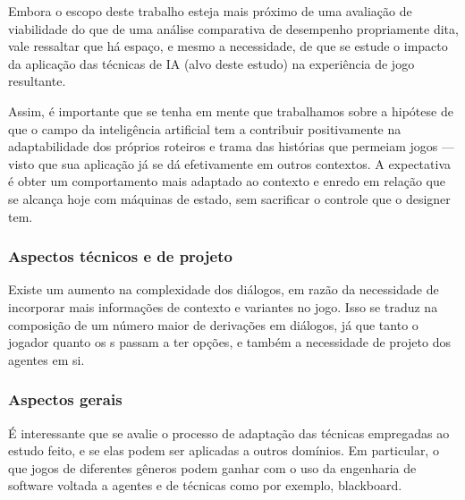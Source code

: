 Embora o escopo deste trabalho esteja mais próximo de uma avaliação de viabilidade do que de uma análise comparativa de desempenho propriamente dita, vale ressaltar que há espaço, e mesmo a necessidade, de que se estude o impacto da aplicação das técnicas de IA (alvo deste estudo) na experiência de jogo resultante.

Assim, é importante que se tenha em mente que trabalhamos sobre a hipótese de que o campo da inteligência artificial tem a contribuir positivamente na adaptabilidade dos próprios roteiros e trama das histórias que permeiam jogos --- visto que sua aplicação já se dá efetivamente em outros contextos. A expectativa é obter um comportamento mais adaptado ao contexto e enredo em relação que se alcança hoje com máquinas de estado, sem sacrificar o controle que o designer tem.

\subsubsection{Aspectos técnicos e de projeto}

Existe um aumento na complexidade dos diálogos, em razão da necessidade de incorporar mais informações de contexto e variantes no jogo. Isso se traduz na composição de um número maior de derivações em diálogos, já que tanto o jogador quanto os \npc{}s passam a ter opções, e também a necessidade de projeto dos agentes em si.

\subsubsection{Aspectos gerais}

É interessante que se avalie o processo de adaptação das técnicas empregadas ao estudo feito, e se elas podem ser aplicadas a outros domínios. Em particular, o que jogos de diferentes gêneros podem ganhar com o uso da engenharia de software voltada a agentes e de técnicas como por exemplo, blackboard.
